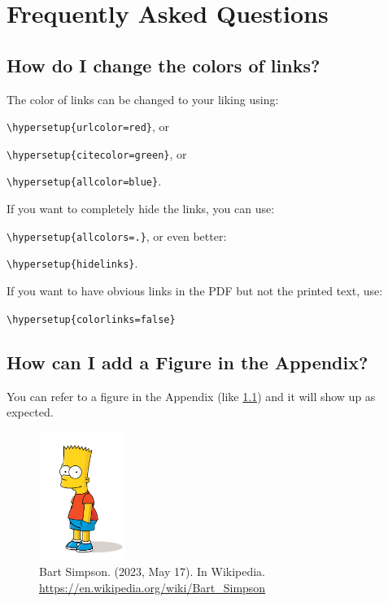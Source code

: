

\chapter{Frequently Asked Questions} %

\label{AppendixA} %

\section{How do I change the colors of links?}

The color of links can be changed to your liking using:

{\small\verb!\hypersetup{urlcolor=red}!}, or

{\small\verb!\hypersetup{citecolor=green}!}, or

{\small\verb!\hypersetup{allcolor=blue}!}.

\noindent If you want to completely hide the links, you can use:

{\small\verb!\hypersetup{allcolors=.}!}, or even better: 

{\small\verb!\hypersetup{hidelinks}!}.

\noindent If you want to have obvious links in the PDF but not the printed text, use:

{\small\verb!\hypersetup{colorlinks=false}!}

\section{How can I add a Figure in the Appendix?}

You can refer to a figure in the Appendix (like \ref{fig:appendix-figure}) and it will show up as expected.

\begin{figure}
\includegraphics[width=0.25\textwidth]{../Bilder/Bart_Simpson.png}
\centering
\caption[A random appendix figure]{Bart Simpson. (2023, May 17). In Wikipedia. \url{https://en.wikipedia.org/wiki/Bart_Simpson}}
\label{fig:appendix-figure}
\end{figure}